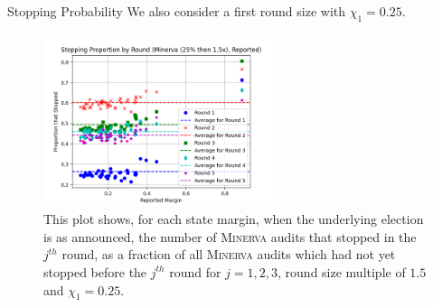\documentclass[final]{beamer}
\newcommand{\Minerva}{\textsc{Minerva}\xspace}
\newlength{\colwidth}
\begin{document}
\begin{frame}[t]
\begin{columns}[t]
\begin{column}{\colwidth}
\begin{block}{Stopping Probability}
We also consider a first round size with $\chi_1=0.25$. 

\begin{figure}
\begin{centering}
\includegraphics[width=0.6\textwidth]{minerva25percthen1p5_sprob.png}
\caption{This plot shows, for each state margin, when the underlying election is as announced, the number of \Minerva audits that stopped in the $j^{th}$ round,
as a fraction of all \Minerva audits which had not yet stopped before the $j^{th}$ round for $j=1,2,3$, round size multiple of $1.5$ and $\chi_1 = 0.25$.}
\label{fig:minerva_25}
\end{centering}
\end{figure}

  \end{block}


\end{column}
\end{columns}
\end{frame}
\end{document}
